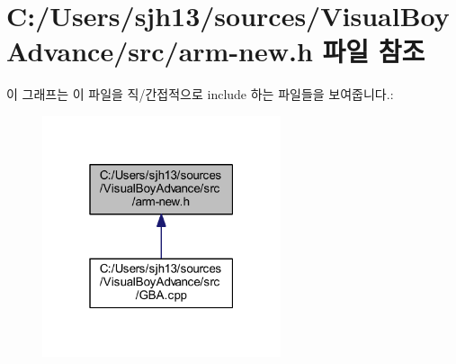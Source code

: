 \hypertarget{arm-new_8h}{}\section{C\+:/\+Users/sjh13/sources/\+Visual\+Boy\+Advance/src/arm-\/new.h 파일 참조}
\label{arm-new_8h}
이 그래프는 이 파일을 직/간접적으로 include 하는 파일들을 보여줍니다.\+:
\nopagebreak
\begin{figure}[H]
\begin{center}
\leavevmode
\includegraphics[width=199pt]{arm-new_8h__dep__incl}
\end{center}
\end{figure}
